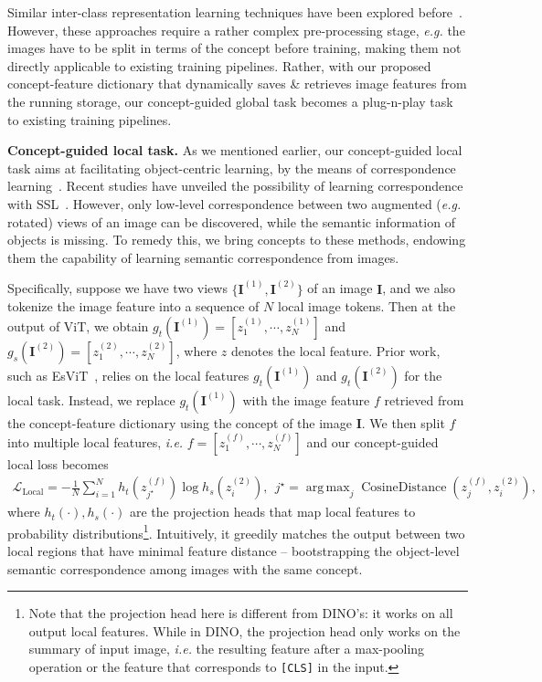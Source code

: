 \documentclass{article} \usepackage{iclr2022_conference,times}
\DeclareMathOperator*{\argmax}{arg\,max}
\renewcommand{\paragraph}[1]{\noindent\textbf{#1.}}
\newcommand{\image}{\mathbf{I}}
\newcommand{\loss}{\mathcal{L}}
\begin{document}
Similar inter-class representation learning techniques have been explored before~\citep{wang2017transitive,caron2018deep}. However, these approaches require a rather complex pre-processing stage, \emph{e.g.} the images have to be split in terms of the concept before training, making them not directly applicable to existing training pipelines. Rather, with our proposed concept-feature dictionary that dynamically saves \& retrieves image features from the running storage, our concept-guided global task becomes a plug-n-play task to existing training pipelines. 


\paragraph{Concept-guided local task}
As we mentioned earlier, our concept-guided local task aims at facilitating object-centric learning, by the means of correspondence learning~\citep{liu2010sift,wang2019learning}. Recent studies have unveiled the possibility of learning correspondence with SSL~\citep{densecl,esvit}. However, only low-level correspondence between two augmented (\emph{e.g.} rotated) views of an image can be discovered, while the semantic information of objects is missing. To remedy this, we bring concepts to these methods, endowing them the capability of learning semantic correspondence from images.

Specifically, suppose we have two views $\{\image^{(1)}, \image^{(2)}\}$ of an image $\image$, and we also tokenize the image feature into a sequence of $N$ local image tokens. Then at the output of ViT, we obtain $g_t(\image^{(1)}) = [z_1^{(1)}, \cdots, z_N^{(1)}]$ and  $g_s(\image^{(2)}) = [z_1^{(2)}, \cdots, z_N^{(2)}]$, where $z$ denotes the local feature. Prior work, such as EsViT~\citep{esvit}, relies on the local features $g_t(\image^{(1)})$ and $g_t(\image^{(2)})$ for the local task. Instead, we replace $g_t(\image^{(1)})$ with the image feature $f$ retrieved from the concept-feature dictionary using the concept of the image $\image$. We then split $f$ into multiple local features, \emph{i.e.} $f = [z_1^{(f)}, \cdots, z_N^{(f)}]$ and our concept-guided local loss becomes
\vskip -0.25in
\begin{align}
    \loss_{\operatorname{Local}} = -\frac{1}{N}\sum^{N}_{i=1}h_t(z_{j^\star}^{(f)})\log h_s(z_i^{(2)}),~~j^\star = \argmax_{j}\operatorname{CosineDistance}(z_j^{(f)}, z_i^{(2)}),
\end{align}
\vskip -0.15in
where $h_t(\cdot), h_s(\cdot)$ are the projection heads that map local features to probability distributions\footnote{Note that the projection head here is different from DINO's: it works on all output local features. While in DINO, the projection head only works on the summary of input image, \emph{i.e.} the resulting feature after a max-pooling operation or the feature that corresponds to \texttt{[CLS]} in the input.}. 
Intuitively, it greedily matches the output between two local regions that have minimal feature distance -- bootstrapping the object-level semantic correspondence among images with the same concept.
\end{document}
